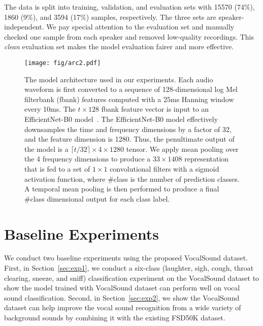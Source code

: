 \documentclass{article}
\newcommand{\squeezeup}{\vspace{-1.6mm}}
\begin{document}
The data is split into training, validation, and evaluation sets with 15570 (74\%), 1860 (9\%), and 3594 (17\%) samples, respectively. The three sets are speaker-independent. We pay special attention to the evaluation set and manually checked one sample from each speaker and removed low-quality recordings. This \emph{clean} evaluation set makes the model evaluation fairer and more effective.



\begin{figure}[t]
  \centering
  \texttt{[image: fig/arc2.pdf]}
  \caption{The model architecture used in our experiments. Each audio waveform is first converted to a sequence of 128-dimensional log Mel filterbank (fbank) features computed with a 25ms Hanning window every 10ms. The $t\times128$ fbank feature vector is input to an EfficientNet-B0 model~\cite{tan2019efficientnet}. The EfficientNet-B0 model effectively downsamples the time and frequency dimensions by a factor of 32, and the feature dimension is 1280. Thus, the penultimate output of the model is a $\lceil t/32\rceil\times4\times1280$ tensor. We apply mean pooling over the 4 frequency dimensions to produce a $33\times1408$ representation that is fed to a set of $1\times1$ convolutional filters with a sigmoid activation function, where \#class is the number of prediction classes. A temporal mean pooling is then performed to produce a final \#class dimensional output for each class label.}
  \label{fig:arc}
  \squeezeup\squeezeup
\end{figure}

\squeezeup\squeezeup
\section{Baseline Experiments}
\squeezeup
\label{sec:exp}

We conduct two baseline experiments using the proposed VocalSound dataset. First, in Section~\ref{sec:exp1}, we conduct a six-class (laughter, sigh, cough, throat clearing, sneeze, and sniff) classification experiment on the VocalSound dataset to show the model trained with VocalSound dataset can perform well on vocal sound classification. Second, in Section~\ref{sec:exp2}, we show the VocalSound dataset can help improve the vocal sound recognition from a wide variety of background sounds by combining it with the existing FSD50K dataset.
\end{document}
